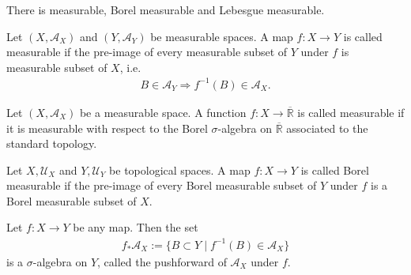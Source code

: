 There is measurable, Borel measurable and Lebesgue measurable.
\begin{definition}
    Let \((X, \mathcal{A}_X)\) and \((Y, \mathcal{A}_Y)\) be measurable spaces. A map \(f: X \rightarrow Y\) is called measurable if the pre-image of every measurable subset of \(Y\) under \(f\) is measurable subset of \(X\), i.e.
        \begin{align}
            B \in \mathcal{A}_Y \Rightarrow f^{-1}(B) \in \mathcal{A}_X \text{.}
        \end{align}
\end{definition}

\begin{definition}
    Let \((X, \mathcal{A}_X)\) be a measurable space. A function \(f: X \rightarrow \overline{\mathbb{R}}\) is called measurable if it is measurable with respect to the Borel \(\sigma\)-algebra on \(\overline{\mathbb{R}}\) associated to the standard topology.
\end{definition}
%
\begin{definition}
    Let \(X, \mathcal{U}_X\) and \(Y, \mathcal{U}_Y\) be topological spaces. A map \(f: X \rightarrow Y\) is called Borel measurable if the pre-image of every Borel measurable subset of \(Y\) under \(f\) is a Borel measurable subset of \(X\).
\end{definition}
%
\begin{definition}[Pushforward]
    Let \(f: X \rightarrow Y\) be any map. Then the set
    \begin{align}
        f_{*} \mathcal{A}_X := \{B \subset Y \mid f^{-1}(B) \in \mathcal{A}_X\}
    \end{align}
    is a \(\sigma\)-algebra on \(Y\), called the pushforward of \(\mathcal{A}_X\) under \(f\).
\end{definition}
%
